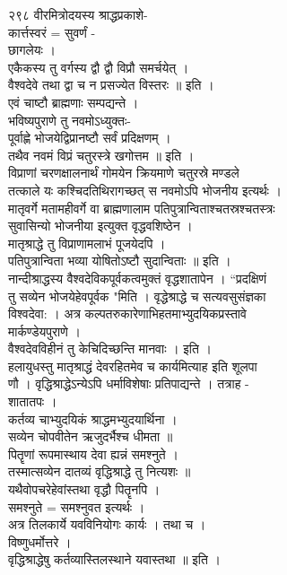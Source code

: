 \documentclass[11pt, openany]{book}
\begin{document}
{{{{{{{{{२९८ वीरमित्रोदयस्य श्राद्धप्रकाशे-\\
कार्त्तस्वरं = सुवर्णं -\\
छागलेयः ।\\
एकैकस्य तु वर्गस्य द्वौ द्वौ विप्रौ समर्चयेत् ।\\
वैश्वदेवे तथा द्वा च न प्रसज्येत विस्तरः ॥ इति ।\\
एवं चाष्टौ ब्राह्मणाः सम्पद्यन्ते ।\\
भविष्यपुराणे तु नवमोऽध्युक्तः-\\
पूर्वाह्णे भोजयेद्विप्रानष्टौ सर्वं प्रदिक्षणम् ।\\
तथैव नवमं विप्रं चतुरस्त्रे खगोत्तम ॥ इति ।\\
विप्राणां चरणक्षालनार्थं गोमयेन क्रियमाणे चतुरस्रे मण्डले\\
तत्काले यः कश्चिदतिथिरागच्छत् स नवमोऽपि भोजनीय इत्यर्थः ।\\
मातृवर्गे मतामहीवर्गे वा ब्राह्मणालाम पतिपुत्रान्विताश्चतस्रश्चतस्त्रः\\
सुवासिन्यो भोजनीया इत्युक्त वृद्धवशिष्ठेन ।\\
मातृश्राद्धे तु विप्राणामलाभं पूजयेदपि ।\\
पतिपुत्रान्विता भव्या योषितोऽष्टौ सुदान्विताः ॥ इति ।\\
नान्दीश्राद्धस्य वैश्वदेविकपूर्वकत्वमुक्तं वृद्धशातापेन । ``प्रदक्षिणं\\
तु सव्येन भोजयेहेवपूर्वक "मिति । वृद्धेश्राद्धे च सत्यवसुसंज्ञका\\
विश्वदेवा: । अत्र कल्पतरुकारेणाभिहतमाभ्युदयिकप्रस्तावे\\
मार्कण्डेयपुराणे ।\\
वैश्वदेवविहीनं तु केचिदिच्छन्ति मानवाः । इति ।\\
हलायुधस्तु मातृश्राद्धं देवरहितमेव च कार्यमित्याह इति शूलपा\\
णौ । वृद्धिश्राद्धेऽन्येऽपि धर्माविशेषाः प्रतिपाद्यन्ते । तत्राह -\\
शातातपः ।\\
कर्तव्य चाभ्युदयिकं श्राद्धमभ्युदयार्थिना ।\\
सव्येन चोपवीतेन ऋजुदर्भैश्च धीमता ॥\\
पितॄणां रूपमास्थाय देवा ह्यन्नं समश्नुते ।\\
तस्मात्सव्येन दातव्यं वृद्धिश्राद्धे तु नित्यशः ॥\\
यथैवोपचरेहेवांस्तथा वृद्धौ पितॄनपि ।\\
समश्नुते = समश्नुवत इत्यर्थः ।\\
अत्र तिलकार्ये यवविनियोगः कार्यः । तथा च ।\\
विष्णुधर्मोत्तरे ।\\
वृद्धिश्राद्धेषु कर्तव्यास्तिलस्थाने यवास्तथा ॥ इति ।

}}}}}}}}}
\end{document}
